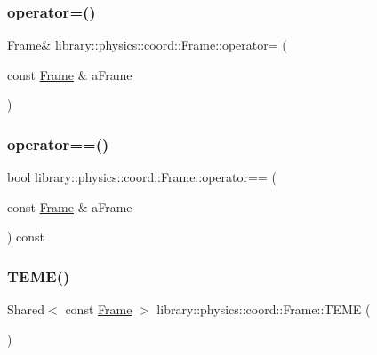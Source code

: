 \subsubsection{\texorpdfstring{operator=()}{operator=()}}
{\footnotesize\ttfamily \hyperlink{classlibrary_1_1physics_1_1coord_1_1_frame}{Frame}\& library\+::physics\+::coord\+::\+Frame\+::operator= (\begin{DoxyParamCaption}\item[{const \hyperlink{classlibrary_1_1physics_1_1coord_1_1_frame}{Frame} \&}]{a\+Frame }\end{DoxyParamCaption})\hspace{0.3cm}{\ttfamily [delete]}}

\mbox{\label{classlibrary_1_1physics_1_1coord_1_1_frame_a19c5c4ce3b1669a774980d9c3f18fe6c}} 
\subsubsection{\texorpdfstring{operator==()}{operator==()}}
{\footnotesize\ttfamily bool library\+::physics\+::coord\+::\+Frame\+::operator== (\begin{DoxyParamCaption}\item[{const \hyperlink{classlibrary_1_1physics_1_1coord_1_1_frame}{Frame} \&}]{a\+Frame }\end{DoxyParamCaption}) const}

\mbox{\label{classlibrary_1_1physics_1_1coord_1_1_frame_a1c59f635fe7a36f416994c83533bfb40}} 
\subsubsection{\texorpdfstring{T\+E\+M\+E()}{TEME()}}
{\footnotesize\ttfamily Shared$<$ const \hyperlink{classlibrary_1_1physics_1_1coord_1_1_frame}{Frame} $>$ library\+::physics\+::coord\+::\+Frame\+::\+T\+E\+ME (\begin{DoxyParamCaption}{ }\end{DoxyParamCaption})\hspace{0.3cm}{\ttfamily [static]}}

